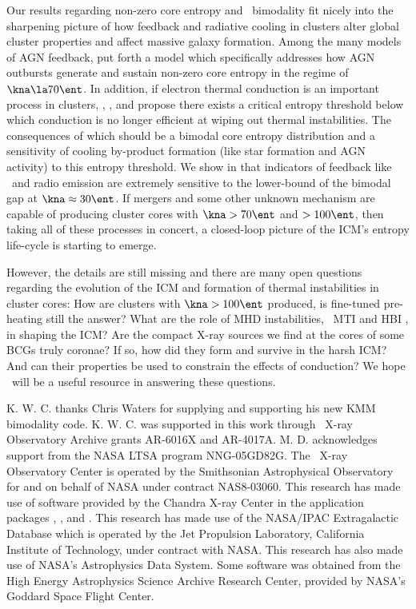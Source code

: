 \documentclass[apj]{emulateapj}
\begin{document}
Our results regarding non-zero core entropy and \kna\ bimodality fit
nicely into the sharpening picture of how feedback and radiative
cooling in clusters alter global cluster properties and affect massive
galaxy formation. Among the many models of AGN feedback,
\citet{agnframework} put forth a model which specifically addresses how
AGN outbursts generate and sustain non-zero core entropy in the regime
of $\kna \la 70 \ent$. In addition, if electron thermal conduction is
an important process in clusters, \citet{radioquiet},
\citet{agnframework}, and \citet{conduction} propose there exists a
critical entropy threshold below which conduction is no longer
efficient at wiping out thermal instabilities. The consequences of
which should be a bimodal core entropy distribution and a sensitivity
of cooling by-product formation (like star formation and AGN activity)
to this entropy threshold. We show in \citet{haradent} that indicators
of feedback like \halpha\ and radio emission are extremely sensitive
to the lower-bound of the bimodal gap at $\kna \approx 30 \ent$. If
mergers and some other unknown mechanism are capable of producing
cluster cores with $\kna > 70 \ent$ and $> 100 \ent$, then taking all
of these processes in concert, a closed-loop picture of the ICM's
entropy life-cycle is starting to emerge.

However, the details are still missing and there are many open
questions regarding the evolution of the ICM and formation of thermal
instabilities in cluster cores: How are clusters with $\kna > 100
\ent$ produced, is fine-tuned pre-heating still the answer? What are
the role of MHD instabilities, \eg\ MTI \citep{2000ApJ...534..420B,
2008ApJ...673..758Q} and HBI \citep{2008ApJ...677L...9P}, in shaping
the ICM?  Are the compact X-ray sources we find at the cores of some
BCGs truly coronae? If so, how did they form and survive in the harsh
ICM? And can their properties be used to constrain the effects of
conduction? We hope \accept\ will be a useful resource in answering
these questions.

\acknowledgements

K. W. C. thanks Chris Waters for supplying and supporting his new KMM
bimodality code. K. W. C. was supported in this work through
\chandra\ X-ray Observatory Archive grants AR-6016X and
AR-4017A. M. D. acknowledges support from the NASA LTSA program
NNG-05GD82G. The \chandra\ X-ray Observatory Center is operated by the
Smithsonian Astrophysical Observatory for and on behalf of NASA under
contract NAS8-03060. This research has made use of software provided
by the Chandra X-ray Center in the application packages \ciao, \chips,
and \sherpa. This research has made use of the NASA/IPAC Extragalactic
Database which is operated by the Jet Propulsion Laboratory,
California Institute of Technology, under contract with NASA. This
research has also made use of NASA's Astrophysics Data System. Some
software was obtained from the High Energy Astrophysics Science
Archive Research Center, provided by NASA's Goddard Space Flight
Center.
\end{document}
